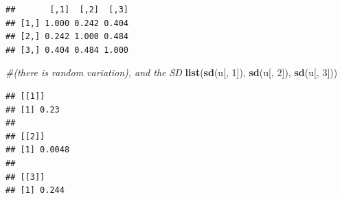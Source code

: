 \documentclass[12pt,]{krantz}
\newenvironment{Shaded}{\begin{snugshade}}{\end{snugshade}}
\newcommand{\CommentTok}[1]{\textcolor[rgb]{0.56,0.35,0.01}{\textit{#1}}}
\newcommand{\DataTypeTok}[1]{\textcolor[rgb]{0.13,0.29,0.53}{#1}}
\newcommand{\DecValTok}[1]{\textcolor[rgb]{0.00,0.00,0.81}{#1}}
\newcommand{\KeywordTok}[1]{\textcolor[rgb]{0.13,0.29,0.53}{\textbf{#1}}}
\newcommand{\NormalTok}[1]{#1}
\newcommand{\OperatorTok}[1]{\textcolor[rgb]{0.81,0.36,0.00}{\textbf{#1}}}
\newcommand{\StringTok}[1]{\textcolor[rgb]{0.31,0.60,0.02}{#1}}
\theoremstyle{definition}
\theoremstyle{definition}
\theoremstyle{definition}
\theoremstyle{remark}
\begin{document}
\begin{Shaded}
\end{Shaded}

\begin{verbatim}
##       [,1]  [,2]  [,3]
## [1,] 1.000 0.242 0.404
## [2,] 0.242 1.000 0.484
## [3,] 0.404 0.484 1.000
\end{verbatim}

\begin{Shaded}
\begin{Highlighting}[]
\CommentTok{#(there is random variation), and the SD}
\KeywordTok{list}\NormalTok{(}\KeywordTok{sd}\NormalTok{(u[, }\DecValTok{1}\NormalTok{]), }\KeywordTok{sd}\NormalTok{(u[, }\DecValTok{2}\NormalTok{]), }\KeywordTok{sd}\NormalTok{(u[, }\DecValTok{3}\NormalTok{]))}
\end{Highlighting}
\end{Shaded}

\begin{verbatim}
## [[1]]
## [1] 0.23
## 
## [[2]]
## [1] 0.0048
## 
## [[3]]
## [1] 0.244
\end{verbatim}
\end{document}
